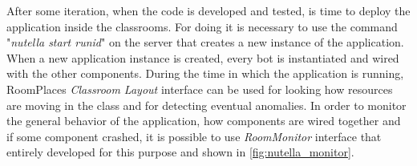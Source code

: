 After some iteration, when the code is developed and tested, is time to deploy the application inside the classrooms. For doing it is necessary to use the command "\textit{nutella start runid}" on the server that creates a new instance of the application. When a new application instance is created, every bot is instantiated and wired with the other components. During the time in which the application is running, RoomPlaces \textit{Classroom Layout} interface can be used for looking how resources are moving in the class and for detecting eventual anomalies. In order to monitor the general behavior of the application, how components are wired together and if some component crashed, it is possible to use \textit{RoomMonitor} interface that entirely developed for this purpose and shown in \ref{fig:nutella_monitor}.
